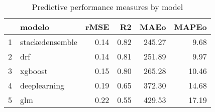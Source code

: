 \begin{table}[ht]
\centering
\caption{Predictive performance measures by model} 
\label{comparo}
\begin{tabular}{rlrrrr}
  \hline
 & modelo & rMSE & R2 & MAEo & MAPEo \\ 
  \hline
1 & stackedensemble & 0.14 & 0.82 & 245.27 & 9.68 \\ 
  2 & drf & 0.14 & 0.81 & 251.89 & 9.97 \\ 
  3 & xgboost & 0.15 & 0.80 & 265.28 & 10.46 \\ 
  4 & deeplearning & 0.19 & 0.65 & 372.30 & 14.68 \\ 
  5 & glm & 0.22 & 0.55 & 429.53 & 17.19 \\ 
   \hline
\end{tabular}
\end{table}
